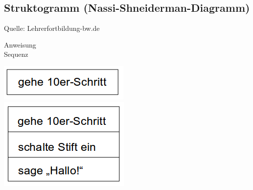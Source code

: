 \newpage

\subsection{Struktogramm (Nassi-Shneiderman-Diagramm)}
\label{sec:Struktogramm}

Quelle: Lehrerfortbildung-bw.de \cite{Struktogramm}

\begin{minipage}[c]{0.25\textwidth}
	Anweisung\\
	Sequenz
\end{minipage}
\hfill
\begin{minipage}[c]{0.65\textwidth}
	\includegraphics[scale=.7]{Bilder/Struktogramm/Anweisung.png}\\
	\includegraphics[scale=.7]{Bilder/Struktogramm/Sequenz.png}
\end{minipage}